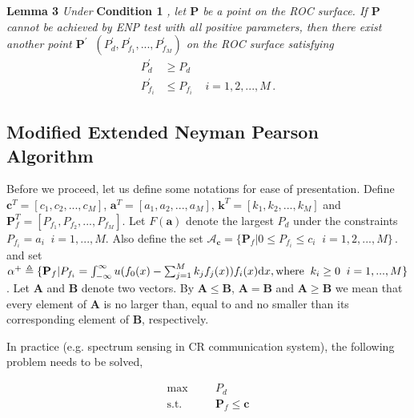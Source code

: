 \documentclass[12pt,journal,a4paper,twoside,onecolumn]{IEEEtran}
\begin{document}
\begin{spacing}{2.5}
\noindent \textbf{Lemma 3}
\textit{
\noindent
Under}
\textbf{Condition 1}
\textit{, let $\mathbf{P}$ be a point on the ROC surface. If  $\mathbf{P}$ cannot be achieved by ENP test with all positive parameters, then there  exist another point $\mathbf{P}^\prime\;\; (P_d^\prime, P_{f_1}^\prime, ..., P_{f_M}^\prime)$ on the ROC surface satisfying
}
\begin{equation}
  \label{equ: lemma 3 equation}
  \begin{split}
    P_d^\prime &\geq P_d\\
    P_{f_i}^\prime &\leq P_{f_i}\;\;\;\;i = 1, 2, ..., M\,.
  \end{split}
\end{equation}

\subsection{Modified Extended Neyman Pearson Algorithm}
\def \JUDGEMENT{u(f_0(x) - \sum_{j=1}^{M}k_j f_j(x))}
Before we proceed, let us define some notations for ease of presentation.
Define $\mathbf{c}^T = [c_1, c_2, ..., c_M]$, $\mathbf{a}^T=[a_1, a_2, ..., a_M]$, $\mathbf{k}^T = [k_1, k_2, ..., k_M]$ and  $\mathbf{P}_f^T = [P_{f_1}, P_{f_2}, ..., P_{f_M}]$. Let
$F(\mathbf{a})$ denote the largest $P_d$ under the constraints $P_{f_i} = a_i\;\;i = 1, ..., M$.
Also define the set $\mathcal{A}_\mathbf{c} = \{
  \mathbf{P}_f | 0 \leq P_{f_i} \leq c_i
  \;\;i=1, 2, ..., M\}\,.
$ and set $\alpha^+ \triangleq \{\mathbf{P}_f | P_{f_i} = \int_{-\infty}^{\infty} \JUDGEMENT f_i(x) \mathrm{d}x, \text{where\;\;} k_i \geq 0 \;\;i=1, ..., M\}$.
Let $\mathbf{A}$ and $\mathbf{B}$ denote two vectors. 
By $\mathbf{A} \leq \mathbf{B}$, $\mathbf{A} = \mathbf{B}$ and  $\mathbf{A} \geq \mathbf{B}$ we mean that every element of $\mathbf{A}$ is no larger than, equal to and no smaller than its corresponding element of $\mathbf{B}$, respectively. 

In practice (e.g. spectrum sensing in CR communication system), the following problem needs to be solved,

      \begin{equation}
      \label{equ: problemstate}
      \begin{split}
      \max\;\;\;\;\;\;&P_d\\
      \text{s.t.}\;\;\;\;\;\;&\mathbf{P}_f \leq \mathbf{c}
      \end{split}
      \end{equation}


\end{spacing}
\end{document}
